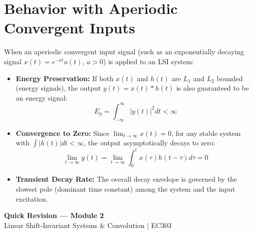 \documentclass[12pt,a4paper]{article}
\begin{document}
\section{Behavior with Aperiodic Convergent Inputs}

When an aperiodic convergent input signal (such as an exponentially decaying signal $x(t) = e^{-at}u(t)$, $a > 0$) is applied to an LSI system:
\begin{itemize}[topsep=2pt, itemsep=2pt]
  \item \textbf{Energy Preservation:} If both $x(t)$ and $h(t)$ are $L_1$ and $L_2$ bounded (energy signals), the output $y(t) = x(t) * h(t)$ is also guaranteed to be an energy signal:
  \begin{equation}
    E_y = \int_{-\infty}^{\infty} |y(t)|^2 dt < \infty
  \end{equation}
  \item \textbf{Convergence to Zero:} Since $\lim_{t \to \infty} x(t) = 0$, for any stable system with $\int |h(t)|dt < \infty$, the output asymptotically decays to zero:
  \begin{equation}
    \lim_{t \to \infty} y(t) = \lim_{t \to \infty} \int_0^t x(\tau) h(t - \tau) d\tau = 0
  \end{equation}
  \item \textbf{Transient Decay Rate:} The overall decay envelope is governed by the slowest pole (dominant time constant) among the system and the input excitation.
\end{itemize}

\newpage
\begin{center}
  {\large\bfseries\color{myred} Quick Revision --- Module 2}\\[3pt]
  {\small\color{mydark} Linear Shift-Invariant Systems \& Convolution $|$ EC303}
\end{center}
\noindent{\color{myred}\rule{\linewidth}{1.2pt}}
\vspace{4pt}
\end{document}
